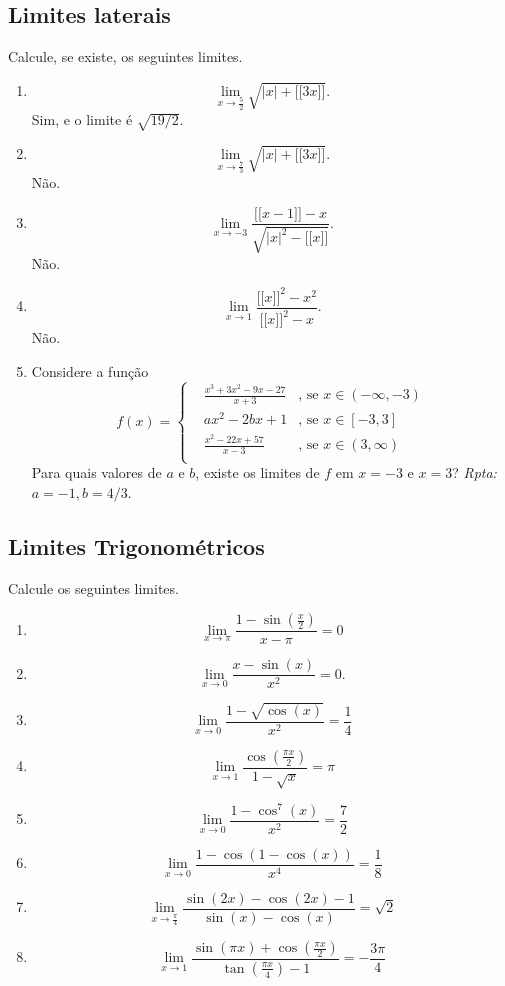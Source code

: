 \documentclass[latin,20pt]{article}
\begin{document}
    \subsection{Limites laterais}   
   Calcule, se existe, os seguintes limites.  
    \begin{enumerate}
    \item $$\lim_{x \rightarrow \frac{5}{2}} 
    \sqrt{|x|+\lbrack\!\lbrack 3x \rbrack\!\rbrack}. $$ Sim, e o limite é $\sqrt{19/2}$.
     \item $$\lim_{x \rightarrow \frac{7}{3}} 
    \sqrt{|x|+\lbrack\!\lbrack 3x \rbrack\!\rbrack}. $$ Não.
    \item $$\lim_{x \rightarrow -3} 
    \frac{\lbrack\!\lbrack x-1 \rbrack\!\rbrack -x}
    {
    \sqrt{|x|^2-\lbrack\!\lbrack x \rbrack\!\rbrack}
    }.$$ Não.
     \item $$\lim_{x \rightarrow 1} 
    \frac{\lbrack\!\lbrack x\rbrack\!\rbrack^{2} -x^{2}}
    {
    \lbrack\!\lbrack x\rbrack\!\rbrack^{2} -x
    }.$$ Não.
    \item Considere a função 
     $$
    f(x)= \left\{  
            \begin{array}{lll}
    &\frac{x^3+3x^2-9x-27}{x+3} &\text{, se } x \in (-\infty, -3) \\
    &ax^2-2bx+1     &\text{, se } x \in [-3,3] \\
            & \frac{x^2-22x+57}{x-3}     &\text{, se } x \in (3,\infty) \\
            \end{array}
            \right. 
    $$
    Para quais valores de $a$ e $b$, existe os limites de $f$ em $x=-3$ e $x=3$? {\it Rpta: } $a=-1, b=4/3$.
    \end{enumerate}
    \subsection{Limites Trigonométricos}   
   Calcule os seguintes limites.  
    \begin{enumerate}
    \item $$\lim_{x \rightarrow \pi} \frac{1-\sin(\frac{x}{2})}{x-\pi}=0$$
    \item $$\lim_{x \rightarrow 0} \frac{x-\sin(x)}{x^2}=0. $$
    \item $$\lim_{x \rightarrow 0} \frac{1-\sqrt{\cos(x)}}{x^2}=\frac{1}{4}$$
    \item $$\lim_{x \rightarrow 1} 
    \frac{\cos(\frac{\pi x}{2})}{1-\sqrt{x}}=\pi$$
    \item $$\lim_{x \rightarrow 0} 
    \frac{1-\cos^7(x)}{x^2}=\frac{7}{2}$$
    \item $$\lim_{x \rightarrow 0} 
    \frac{1-\cos(1-\cos(x))}{x^4}=\frac{1}{8}$$
    \item $$\lim_{x \rightarrow \frac{\pi}{4}} 
    \frac{\sin(2x)-\cos(2x)-1}{\sin(x)-\cos(x)}=\sqrt{2}$$
    \item $$\lim_{x \rightarrow 1} 
    \frac{\sin(\pi x)+\cos(\frac{\pi x}{2})}
    {\tan(\frac{\pi x}{4})-1}=-\frac{3 \pi}{4}$$
    \end{enumerate}
\end{document}
